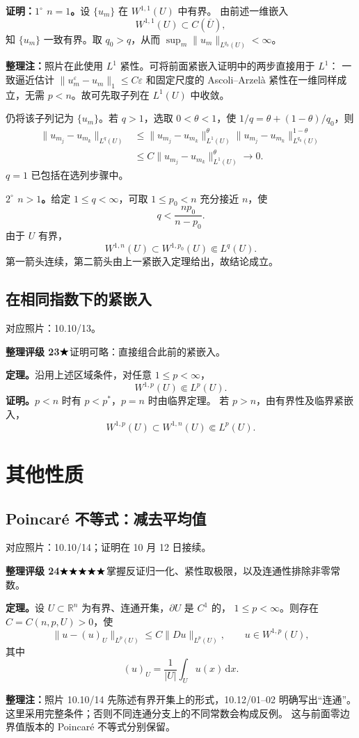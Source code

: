 \documentclass[UTF8,a4paper,11pt,fontset=fandol]{ctexart}
\newcommand{\R}{\mathbb R}
\newcommand{\dd}{\,\mathrm d}
\newcommand{\ednote}[1]{\par{\small\color{notegray}\textbf{整理注：}#1}\par}
\newcommand{\source}[1]{{\small\color{notegray}对应照片：#1。}\par}
\newcommand{\proofstars}[1]{\ensuremath{%
\ifnum#1>0\relax\bigstar\fi
\ifnum#1>1\relax\bigstar\fi
\ifnum#1>2\relax\bigstar\fi
\ifnum#1>3\relax\bigstar\fi
\ifnum#1>4\relax\bigstar\fi}}
\newcommand{\proofrating}[3]{\par{\small\color{proofblue}%
\textbf{整理评级 #1}\enspace\proofstars{#2}\quad #3\par}}
\begin{document}
\textbf{证明：$1^\circ$ $n=1$。}设 $\{u_m\}$ 在 $W^{1,1}(U)$ 中有界。
由前述一维嵌入
\[
W^{1,1}(U)\subset C(\overline U),
\]
知 $\{u_m\}$ 一致有界。取 $q_0>q$，从而
$\sup_m\|u_m\|_{L^{q_0}(U)}<\infty$。
\ednote{照片在此使用 $L^1$ 紧性。可将前面紧嵌入证明中的两步直接用于 $L^1$：
一致逼近估计 $\|u_m^\varepsilon-u_m\|_1\leq C\varepsilon$ 和固定尺度的
Ascoli--Arzelà 紧性在一维同样成立，无需 $p<n$。故可先取子列在 $L^1(U)$ 中收敛。}
仍将该子列记为 $\{u_m\}$。若 $q>1$，选取 $0<\theta<1$，使
$1/q=\theta+(1-\theta)/q_0$，则
\[
\begin{aligned}
\|u_{m_j}-u_{m_k}\|_{L^q(U)}
&\leq\|u_{m_j}-u_{m_k}\|_{L^1(U)}^\theta
       \|u_{m_j}-u_{m_k}\|_{L^{q_0}(U)}^{1-\theta}\\
&\leq C\|u_{m_j}-u_{m_k}\|_{L^1(U)}^\theta\longrightarrow0.
\end{aligned}
\]
$q=1$ 已包括在选列步骤中。

\textbf{$2^\circ$ $n>1$。}给定 $1\leq q<\infty$，可取 $1\leq p_0<n$ 充分接近 $n$，使
\[
q<\frac{np_0}{n-p_0}.
\]
由于 $U$ 有界，
\[
W^{1,n}(U)\subset W^{1,p_0}(U)\Subset L^q(U).
\]
第一箭头连续，第二箭头由上一紧嵌入定理给出，故结论成立。

\subsection{在相同指数下的紧嵌入}
\source{10.10/13}
\proofrating{23}{1}{证明可略：直接组合此前的紧嵌入。}
\textbf{定理。}沿用上述区域条件，对任意 $1\leq p<\infty$，
\[
\boxed{W^{1,p}(U)\Subset L^p(U).}
\]
\textbf{证明。}$p<n$ 时有 $p<p^*$，$p=n$ 时由临界定理。
若 $p>n$，由有界性及临界紧嵌入，
\[
W^{1,p}(U)\subset W^{1,n}(U)\Subset L^p(U).
\]

\newpage
\section{其他性质}
\subsection{Poincaré 不等式：减去平均值}
\source{10.10/14；证明在 10 月 12 日接续}
\proofrating{24}{5}{掌握反证归一化、紧性取极限，以及连通性排除非零常数。}
\textbf{定理。}设 $U\subset\R^n$ 为有界、连通开集，$\partial U$ 是 $C^1$ 的，
$1\leq p<\infty$。则存在 $C=C(n,p,U)>0$，使
\[
\boxed{\|u-(u)_U\|_{L^p(U)}\leq C\|Du\|_{L^p(U)},
\qquad u\in W^{1,p}(U),}
\]
其中
\[
(u)_U=\frac1{|U|}\int_Uu(x)\dd x.
\]
\ednote{照片 10.10/14 先陈述有界开集上的形式，10.12/01--02 明确写出“连通”。
这里采用完整条件；否则不同连通分支上的不同常数会构成反例。
这与前面零边界值版本的 Poincaré 不等式分别保留。}
\end{document}
